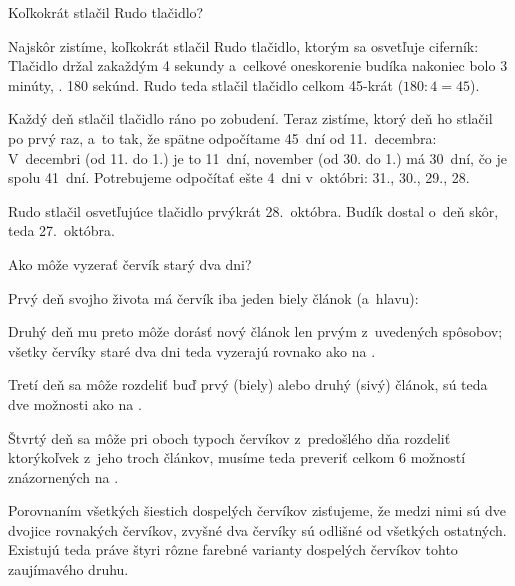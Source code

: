 {%
\napad
Koľkokrát stlačil Rudo tlačidlo?

\riesenie
Najskôr zistíme, koľkokrát stlačil Rudo tlačidlo, ktorým sa osvetľuje
ciferník:
Tlačidlo držal zakaždým 4 sekundy a~celkové oneskorenie budíka nakoniec bolo 3 minúty, \tj. 180 sekúnd.
Rudo teda stlačil tlačidlo celkom 45-krát ($180:4=45$).

Každý deň stlačil tlačidlo ráno po zobudení.
Teraz zistíme, ktorý deň ho stlačil po prvý raz, a~to tak, že
spätne odpočítame 45~dní od 11.~decembra:
V~decembri (od 11. do 1.) je to 11~dní, november (od 30. do 1.) má 30~dní,
čo je spolu 41~dní.
Potrebujeme odpočítať ešte 4~dni v~októbri: 31., 30., 29., 28.

Rudo stlačil osvetľujúce tlačidlo prvýkrát 28.~októbra.
Budík dostal o~deň skôr, teda 27.~októbra.
}

{%
\napad
Ako môže vyzerať červík starý dva dni?

\riesenie
Prvý deň svojho života má červík iba jeden biely článok (a~hlavu):

Druhý deň mu preto môže dorásť nový článok len prvým z~uvedených spôsobov;
všetky červíky staré dva dni teda vyzerajú rovnako ako na \obrplus\obr.

Tretí deň sa môže rozdeliť buď prvý (biely) alebo druhý (sivý) článok,
sú teda dve možnosti ako na \obr.

Štvrtý deň sa môže pri oboch typoch červíkov z~predošlého dňa rozdeliť
ktorýkoľvek z~jeho troch článkov, musíme teda preveriť celkom 6 možností znázornených na \obr.

Porovnaním všetkých šiestich dospelých červíkov zisťujeme, že medzi nimi sú dve
dvojice rovnakých červíkov, zvyšné dva červíky sú odlišné od všetkých ostatných.
Existujú teda práve štyri rôzne farebné varianty dospelých červíkov tohto
zaujímavého druhu.
}

